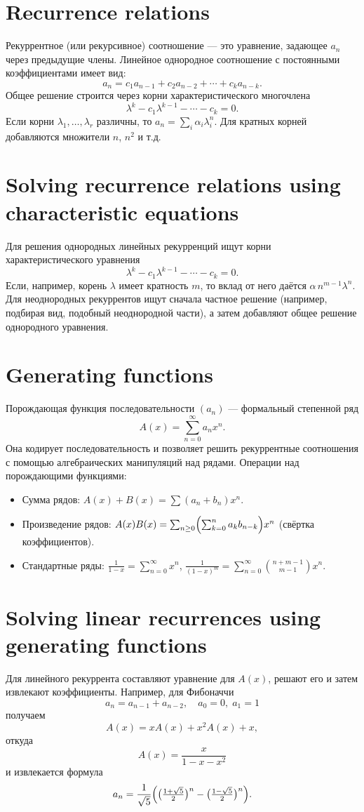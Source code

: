 \documentclass{article}
\begin{document}
	\section{Recurrence relations}
	Рекуррентное (или рекурсивное) соотношение --- это уравнение, задающее $a_n$ через предыдущие члены. Линейное однородное соотношение с постоянными коэффициентами имеет вид:
	\[
	a_n = c_1 a_{n-1} + c_2 a_{n-2} + \cdots + c_k a_{n-k}.
	\]
	Общее решение строится через корни характеристического многочлена
	\[
	\lambda^k - c_1 \lambda^{k-1} - \cdots - c_k = 0.
	\]
	Если корни $\lambda_1,\dots,\lambda_r$ различны, то $a_n = \sum_i \alpha_i \lambda_i^n$. Для кратных корней добавляются множители $n$, $n^2$ и т.д.
	
	\section{Solving recurrence relations using characteristic equations}
	Для решения однородных линейных рекурренций ищут корни характеристического уравнения 
	\[
	\lambda^k - c_1 \lambda^{k-1} - \cdots - c_k = 0.
	\]
	Если, например, корень $\lambda$ имеет кратность $m$, то вклад от него даётся $\alpha\,n^{m-1}\lambda^n$. Для неоднородных рекуррентов ищут сначала частное решение (например, подбирая вид, подобный неоднородной части), а затем добавляют общее решение однородного уравнения.
	
	\section{Generating functions}
	Порождающая функция последовательности $(a_n)$ --- формальный степенной ряд
	\[
	A(x) = \sum_{n=0}^\infty a_n x^n.
	\]
	Она кодирует последовательность и позволяет решить рекуррентные соотношения с помощью алгебраических манипуляций над рядами. Операции над порождающими функциями:
	\begin{itemize}
		\item Сумма рядов: $A(x)+B(x)=\sum (a_n+b_n)x^n$.
		\item Произведение рядов: $A(x)B(x)=\sum_{n\ge0}\Bigl(\sum_{k=0}^n a_k b_{n-k}\Bigr)x^n$ (свёртка коэффициентов).
		\item Стандартные ряды: $\frac{1}{1-x}=\sum_{n=0}^\infty x^n$, \;$\frac{1}{(1-x)^m}=\sum_{n=0}^\infty \binom{n+m-1}{m-1}x^n$.
	\end{itemize}
	
	\section{Solving linear recurrences using generating functions}
	Для линейного рекуррента составляют уравнение для $A(x)$, решают его и затем извлекают коэффициенты. Например, для Фибоначчи 
	\[
	a_n = a_{n-1} + a_{n-2},\quad a_0=0,\;a_1=1
	\]
	получаем 
	\[
	A(x) = xA(x) + x^2 A(x) + x,
	\]
	откуда 
	\[
	A(x)=\frac{x}{1-x-x^2}
	\]
	и извлекается формула 
	\[
	a_n = \frac{1}{\sqrt5}\Bigl(\bigl(\tfrac{1+\sqrt5}2\bigr)^n - \bigl(\tfrac{1-\sqrt5}2\bigr)^n\Bigr).
	\]
	
\end{document}
